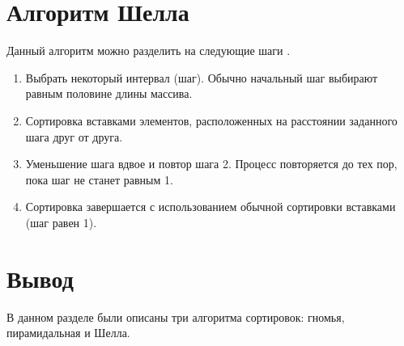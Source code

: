 \section{Алгоритм Шелла}


Данный алгоритм можно разделить на следующие шаги \cite{shell}.

\begin{enumerate}
	\item Выбрать некоторый интервал (шаг). Обычно начальный шаг выбирают равным половине длины массива.
	\item Сортировка вставками элементов, расположенных на расстоянии заданного шага друг от друга.
	\item Уменьшение шага вдвое и повтор шага 2. Процесс повторяется до тех пор, пока шаг не станет равным 1.
	\item Сортировка завершается с использованием обычной сортировки вставками (шаг равен 1).
\end{enumerate}


\section*{Вывод}

В данном разделе были описаны три алгоритма сортировок: гномья, пирамидальная и Шелла.
